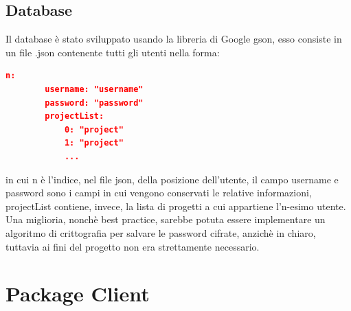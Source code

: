 \documentclass[]{article}
\begin{document}
\subsection{Database}
Il database è stato sviluppato usando la libreria di Google gson, esso consiste in un file .json contenente tutti gli utenti nella forma:
\begin{lstlisting}[language=json]
	n:
		username: "username"
		password: "password"
		projectList:
			0: "project"
			1: "project"
			...
\end{lstlisting}
in cui n è l'indice, nel file json, della posizione dell'utente, il campo username e password sono i campi in cui vengono conservati le relative informazioni, projectList contiene, invece, la lista di progetti a cui appartiene l'n-esimo utente.
Una miglioria, nonchè best practice, sarebbe potuta essere implementare un algoritmo di crittografia per salvare le password cifrate, anzichè in chiaro, tuttavia ai fini del progetto non era strettamente necessario.
\section{Package Client}
\end{document}
